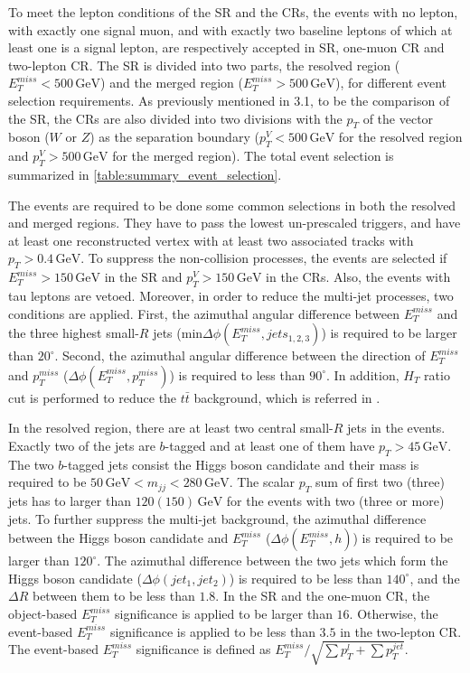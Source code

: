 \documentclass[class=NTHU_thesis, crop=false]{standalone}
\begin{document}
To meet the lepton conditions of the SR and the CRs, the events with no lepton, with exactly one signal muon, and with exactly two baseline leptons of which at least one is a signal lepton, are respectively accepted in SR, one-muon CR and two-lepton CR. The SR is divided into two parts, the resolved region ($E^{miss}_T < 500\, \mathrm{GeV}$) and the merged region ($E^{miss}_T > 500\, \mathrm{GeV}$), for different event selection requirements. As previously mentioned in 3.1, to be the comparison of the SR, the CRs are also divided into two divisions with the $p_T$ of the vector boson ($W$ or $Z$) as the separation boundary ($p^V_T < 500\, \mathrm{GeV}$ for the resolved region and $p^V_T > 500\, \mathrm{GeV}$ for the merged region). The total event selection is summarized in \cref{table:summary_event_selection}.

The events are required to be done some common selections in both the resolved and merged regions. They have to pass the lowest un-prescaled triggers, and have at least one reconstructed vertex with at least two associated tracks with $p_T > 0.4\, \mathrm{GeV}$. To suppress the non-collision processes, the events are selected if $E^{miss}_T > 150\, \mathrm{GeV}$ in the SR and $p^V_T > 150\, \mathrm{GeV}$ in the CRs. Also, the events with tau leptons are vetoed. Moreover, in order to reduce the multi-jet processes, two conditions are applied. First, the azimuthal angular difference between $E^{miss}_T$ and the three highest small-$R$ jets (min$\Delta\phi(E^{miss}_T, jets_{1, 2, 3})$) is required to be larger than $20^\circ$. Second, the azimuthal angular difference between the direction of $E^{miss}_T$ and $p^{miss}_T$ ($\Delta\phi(E^{miss}_T, p^{miss}_T)$) is required to less than $90^\circ$. In addition, $H_T$ ratio cut is performed to reduce the $t\bar{t}$ background, which is referred in \cite{Meehan:2225941}.

In the resolved region, there are at least two central small-$R$ jets in the events. Exactly two of the jets are $b$-tagged and at least one of them have $p_T > 45\, \mathrm{GeV}$. The two $b$-tagged jets consist the Higgs boson candidate and their mass is required to be $50\, \mathrm{GeV} < m_{jj} < 280\, \mathrm{GeV}$. The scalar $p_T$ sum of first two (three) jets has to larger than $120 (150)\, \mathrm{GeV}$ for the events with two (three or more) jets. To further suppress the multi-jet background, the azimuthal difference between the Higgs boson candidate and $E^{miss}_T$ ($\Delta\phi(E^{miss}_T, h)$) is required to be larger than $120^\circ$. The azimuthal difference between the two jets which form the Higgs boson candidate ($\Delta\phi(jet_1, jet_2)$) is required to be less than $140^\circ$, and the ${\Delta}R$ between them to be less than $1.8$. In the SR and the one-muon CR, the object-based $E^{miss}_T$ significance is applied to be larger than $16$. Otherwise, the event-based $E^{miss}_T$ significance is applied to be less than $3.5$ in the two-lepton CR. The event-based $E^{miss}_T$ significance is defined as $E^{miss}_T/\sqrt{{\sum}p^l_T+{\sum}p^{jet}_T}$.
\end{document}
